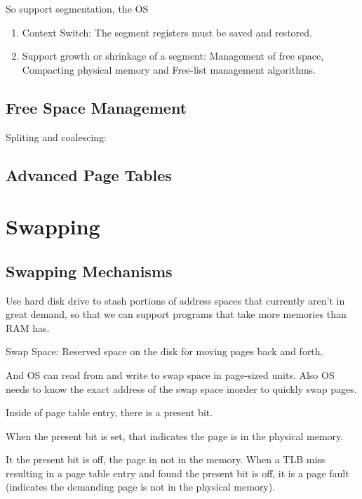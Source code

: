     So support segmentation, the OS
    \begin{enumerate}
        \item Context Switch: The segment registers must be saved and restored.
        \item Support growth or shrinkage of a segment: Management of free space, Compacting physical memory and
        Free-list management algorithms.
    \end{enumerate}

\subsection{Free Space Management}


    Spliting and coalescing:



\subsection{Advanced Page Tables}


\section{Swapping}

   
\subsection{Swapping Mechanisms}

Use hard disk drive to stash portions of address spaces that currently aren't in
great demand, so that we can support programs that take more memories than RAM has.


    Swap Space: Reserved space on the disk for moving pages back and forth.

    And OS can read from and write to swap space in page-sized units. Also OS needs
    to know the exact address of the swap space inorder to quickly swap pages.


    Inside of page table entry, there is a present bit.

    When the present bit is set, that indicates the page is in the physical memory.

    It the present bit is off, the page in not in the memory. When a TLB miss resulting
    in a page table entry and found the present bit is off, it is a page fault (indicates
     the demanding page is not in the physical memory).

